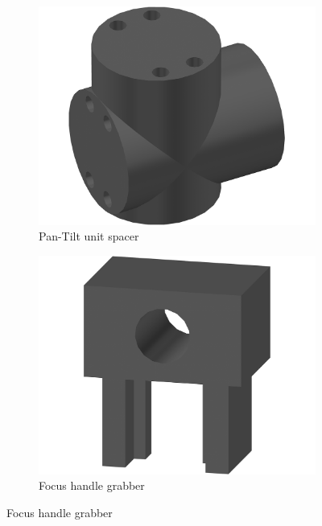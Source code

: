 \begin{figure}[htbp]
        \centering
        \begin{subfigure}[b]{0.3\textwidth}
                \includegraphics[width=\textwidth]{images/cad/spacer.png}
                \caption{Pan-Tilt unit spacer}
                \label{img:spacer}
        \end{subfigure}
        \quad
        \begin{subfigure}[b]{0.3\textwidth}
                \includegraphics[width=\textwidth]{images/cad/focus.png}
                \caption{Focus handle grabber}
                \label{img:focusHandle}
        \end{subfigure}

\end{figure}
